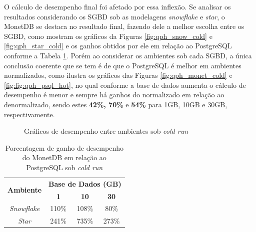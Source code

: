 O cálculo de desempenho final foi afetado por essa inflexão. Se analisar os resultados considerando os SGBD sob as modelagens \textit{snowflake} e \textit{star}, o MonetDB se destaca no resultado final, fazendo dele a melhor escolha entre os SGBD, como mostram os gráficos da Figuras \ref{fig:qph_snow_cold} e \ref{fig:qph_star_cold} e os ganhos obtidos por ele em relação ao PostgreSQL conforme a Tabela \ref{tab:ganho_monet_psql_cold}. Porém ao considerar os ambientes sob cada SGBD, a única conclusão coerente que se tem é de que o PostgreSQL é melhor em ambientes normalizados, como ilustra os gráficos das Figuras \ref{fig:qph_monet_cold} e \ref{fig:fig:qph_psql_hot}, no qual conforme a base de dados aumenta o cálculo de desempenho é menor e sempre há ganhos do normalizado em relação ao denormalizado, sendo estes \textbf{42\%, 70\%} e \textbf{54\%} para 1GB, 10GB e 30GB, respectivamente.

\begin{figure}[htpb]
        \centering
        \caption{Gráficos de desempenho entre ambientes sob \textit{cold run}}
        \label{fig:qph_model_cold}
\end{figure}

\begin{table}[htpb]
        \centering
        \caption{Porcentagem de ganho de desempenho do MonetDB em relação ao PostgreSQL sob \textit{cold run}}
        \label{tab:ganho_monet_psql_cold}
        \begin{tabular}{|c|c|c|c|}
        \hline
        \multirow{2}{*}{\textbf{Ambiente}} & \multicolumn{3}{c|}{\textbf{Base de Dados (GB)}} \\ \cline{2-4} 
                                           & \textbf{1}     & \textbf{10}    & \textbf{30}    \\ \hline
        \textit{Snowflake}                 & 110\%          & 108\%          & 80\%           \\ \hline
        \textit{Star}                      & 241\%          & 735\%          & 273\%          \\ \hline
        \end{tabular}
\end{table}

